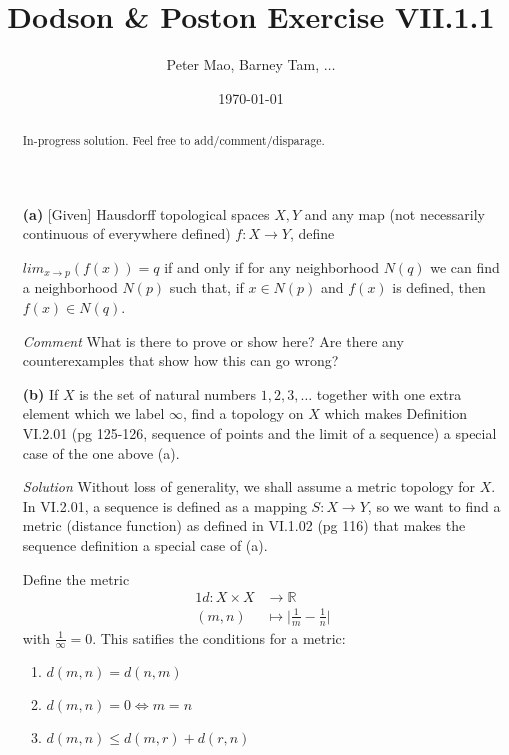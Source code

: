 \documentclass[11pt]{article}
\title{Dodson \& Poston Exercise VII.1.1}
\author{Peter Mao, Barney Tam, $\ldots$}
\date{\today}
\begin{document}
\maketitle
\pagestyle{empty}

\begin{abstract}
  In-progress solution.  Feel free to add/comment/disparage.
\end{abstract}

\begin{itemize}
\item
  [\textbf{(a)}] [Given] Hausdorff topological spaces $X,Y$ and any
  map (not necessarily continuous of everywhere defined) $f: X \to Y$,
  define

  $lim_{x\to p}(f(x)) = q$ if and only if for any neighborhood $N(q)$
  we can find a neighborhood $N(p)$ such that, if $x \in N(p)$ and
  $f(x)$ is defined, then $f(x) \in N(q)$.

\item [\emph{Comment}]
  What is there to prove or show here?  Are there any counterexamples
  that show how this can go wrong?

\item
  [\textbf{(b)}] If $X$ is the set of natural numbers $1,2,3,\ldots$
  together with one extra element which we label $\infty$, find a
  topology on $X$ which makes Definition VI.2.01 (pg 125-126, sequence
  of points and the limit of a sequence) a special case of the one
  above (a).

\item
  [\emph{Solution}]
Without loss of generality, we shall assume a metric topology for $X$.
In VI.2.01, a sequence is defined as a mapping $S: X \to Y$,
so we want to find a metric (distance function) as defined in VI.1.02
(pg 116) that makes the sequence definition a special case of (a).

Define the metric
\begin{alignat}{1}
  d \colon  X \times X &\to \mathbb{R} \\
            (m,n)      &\mapsto \bigg|\frac{1}{m} - \frac{1}{n}\bigg|
\end{alignat}
with $\frac{1}{\infty} = 0$. This satifies the conditions for a metric:
\begin{enumerate}[label=\roman*), itemsep=0pt]
\item $d(m,n) = d(n,m)$
\item $d(m,n) = 0 \iff m = n$
\item $d(m,n) \le d(m,r) + d(r,n)$
\end{enumerate}


\end{itemize}
\end{document}
